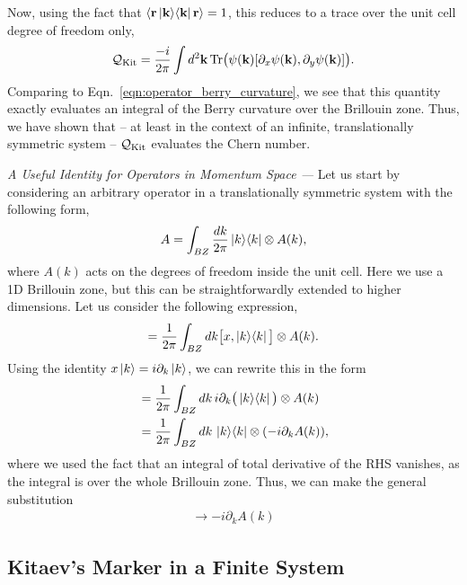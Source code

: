 Now, using the fact that $ \braket{\textbf r \ket{\textbf k}\!\bra{\textbf k}  \textbf r}  = 1$, this reduces to a trace over the unit cell degree of freedom only,
\begin{align}
    \mathcal Q_{\textup{Kit}} = \frac{-i}{2\pi} \int d^2 \textbf k \, 
    \textup{Tr} \big (
        \psi(\textbf k) [\partial_x \psi(\textbf k), \partial_y \psi(\textbf k)]
    \big ).
\end{align} 
Comparing to Eqn.~\ref{eqn:operator_berry_curvature}, we see that this quantity exactly evaluates an integral of the Berry curvature over the Brillouin zone. Thus, we have shown that -- at least in the context of an infinite, translationally symmetric system -- $\mathcal Q_{\textup{Kit}}$ evaluates the Chern number.

\begin{shaded}
    {\it A Useful Identity for Operators in Momentum Space --- } Let us start by considering an arbitrary operator in a translationally symmetric system with the following form,
    \begin{align}
        A =  \int_{BZ} \frac{d k}{2\pi} \ket{k}\!\bra{k} \otimes A(k),
    \end{align}
    where $A(k)$ acts on the degrees of freedom inside the unit cell. Here we use a 1D Brillouin zone, but this can be straightforwardly extended to 
    higher dimensions. Let us consider the following expression,
    \begin{align}
        [x, A] = \frac{1}{2\pi} \int_{BZ} d k \big [x,\ketbra k k \big ] \otimes A(k).
    \end{align} 
    Using the identity $x\ket k = i\partial_k \ket k$, we can rewrite this in the form
    \begin{align}
        [x, A] & = \frac{1}{2\pi} \int_{BZ} d k\, i \partial_k \big(\ketbra k k \big) \otimes A(k) \\ 
        &= \frac{1}{2\pi} \int_{BZ} d k\,  \ketbra k k 
        \otimes ( -i \partial_k A(k)),
    \end{align} 
    where we used the fact that an integral of total derivative of the RHS vanishes, as the integral is over the whole Brillouin zone. Thus, we can make the general substitution
    \begin{align}
        [x,A] \rightarrow -i \partial_{k} A(k)
    \end{align}
\end{shaded}

\subsection{Kitaev's Marker in a Finite System} \label{sec:finite_kitaev}

